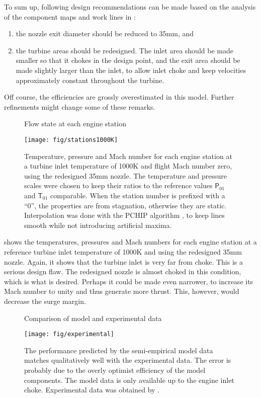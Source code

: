 To sum up, following design recommendations can be made based on the analysis of the component maps and work lines in :
\begin{enumerate}
    \item the nozzle exit diameter should be reduced to 35mm, and
    \item the turbine areas should be redesigned. The inlet area should be made smaller so that it chokes in the design point, and the exit area should be made slightly larger than the inlet, to allow inlet choke and keep velocities approximately constant throughout the turbine.
\end{enumerate}

Off course, the efficiencies are grossly overestimated in this model. Further refinements might change some of these remarks.

\begin{figure}
    \caption{Flow state at each engine station}
    \label{fig:stations}
    \texttt{[image: fig/stations1000K]}
    \caption*{Temperature, pressure and Mach number for each engine station at a turbine inlet temperature of 1000K and flight Mach number zero, using the redesigned 35mm nozzle. The temperature and pressure scales were chosen to keep their ratios to the reference values $\mathsf P_{01}$ and $\mathsf T_{01}$ comparable. When the station number is prefixed with a ``0'', the properties are from stagnation, otherwise they are static. Interpolation was done with the PCHIP algorithm \cite{Fritsch1980}, to keep lines smooth while not introducing artificial maxima.}
\end{figure}

 shows the temperatures, pressures and Mach numbers for each engine station at a reference turbine inlet temperature of 1000K and using the redesigned 35mm nozzle.
Again, it shows that the turbine inlet is very far from choke. This is a serious design flaw. The redesigned nozzle is almost choked in this condition, which is what is desired. Perhaps it could be made even narrower, to increase its Mach number to unity and thus generate more thrust. This, however, would decrease the surge margin.


\begin{figure}
    \caption{Comparison of model and experimental data}
    \label{fig:experimental}
    \texttt{[image: fig/experimental]}
    \source{\authorsfigure}
    \caption*{The performance predicted by the semi-empirical model data matches qualitatively well with the experimental data. The error is probably due to the overly optimist efficiency of the model components. The model data is only available up to the engine inlet choke. Experimental data was obtained by \textcite{bolsoni_test}.}
\end{figure}

